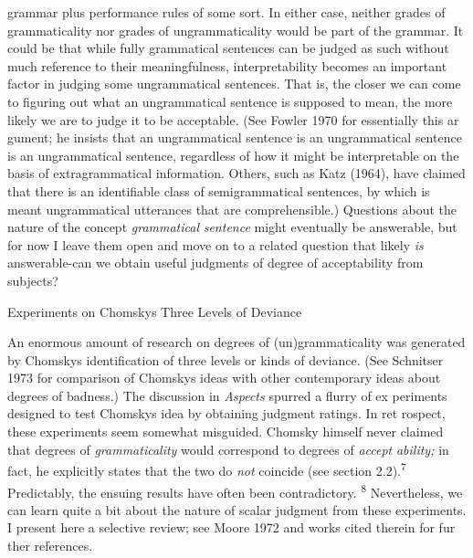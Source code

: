 \begin{styleTextbody}
grammar plus performance rules of some sort. In either case, neither grades of grammaticality nor grades of ungrammaticality would be part of the grammar. It could be that while fully grammatical sentences can be judged as such without much reference to their meaningfulness, interpretability becomes an important factor in judging some ungrammatical sentences. That is, the closer we can come to figuring out what an ungrammatical sentence is supposed to mean, the more likely we are to judge it to be acceptable. (See Fowler 1970 for essentially this ar\- gument; he insists that {\textquotedbl}an ungrammatical sentence is an ungrammatical sentence is an ungrammatical sentence,{\textquotedbl} regardless of how it might be interpretable on the basis of extragrammatical information. Others, such as Katz (1964), have claimed that there is an identifiable class of semigrammatical sentences, by which is meant ungrammatical utterances that are comprehensible.) Questions about the nature of the concept \textit{grammatical}\textit{ }\textit{sentence}\textit{ }might eventually be answerable, but for now I leave them open and move on to a related question that likely \textit{is}\textit{ }answerable-can we obtain useful judgments of degree of acceptability from subjects?
\end{styleTextbody}


\begin{styleHeadingviii}
Experiments on Chomsky{\textquotesingle}s Three Levels of Deviance
\end{styleHeadingviii}


\begin{styleTextbody}
An enormous amount of research on degrees of (un)grammaticality was generated by Chomsky{\textquotesingle}s identification of three levels or kinds of deviance. (See Schnitser 1973 for comparison of Chomsky{\textquotesingle}s ideas with other contemporary ideas about degrees of badness.) The discussion in \textit{Aspects}\textit{ }spurred a flurry of ex\- periments designed to test Chomsky{\textquotesingle}s idea by obtaining judgment ratings. In ret\- rospect, these experiments seem somewhat misguided. Chomsky himself never claimed that degrees of \textit{grammaticality }would correspond to degrees of \textit{accept\-}\textit{ }\textit{ability;}\textit{ }in fact, he explicitly states that the two do \textit{not}\textit{ }coincide (see section 2.2).\textsuperscript{7}\textsuperscript{ }Predictably, the ensuing results have often been contradictory. \textsuperscript{8}\textsuperscript{ }Nevertheless, we can learn quite a bit about the nature of scalar judgment from these experiments. I present here a selective review; see Moore 1972 and works cited therein for fur\- ther references.
\end{styleTextbody}


